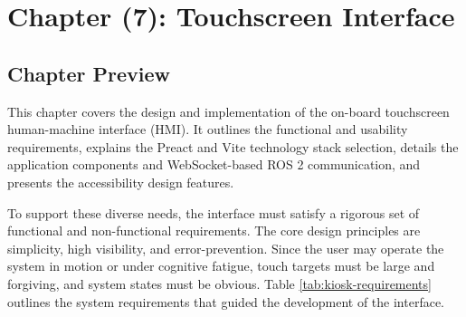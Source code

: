 \setcounter{chapter}{7} 
\chapter*{Chapter (7): Touchscreen Interface}
\renewcommand{\thesection}{\thechapter.\arabic{section}}
\setcounter{section}{0}
\captionsetup[figure]{justification=centering}


\section{Chapter Preview}
This chapter covers the design and implementation of the on-board touchscreen human-machine interface (HMI). It outlines the functional and usability requirements, explains the Preact and Vite technology stack selection, details the application components and WebSocket-based ROS 2 communication, and presents the accessibility design features.

To support these diverse needs, the interface must satisfy a rigorous set of functional and non-functional requirements. The core design principles are simplicity, high visibility, and error-prevention. Since the user may operate the system in motion or under cognitive fatigue, touch targets must be large and forgiving, and system states must be obvious. Table \ref{tab:kiosk-requirements} outlines the system requirements that guided the development of the interface.

